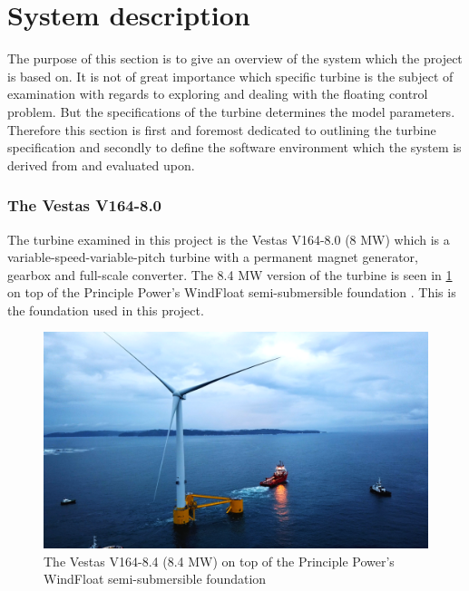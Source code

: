 \section{System description} \label{sec:sys-descr}
The purpose of this section is to give an overview of the system which the project is based on. It is not of great importance which specific turbine is the subject of examination with regards to exploring and dealing with the floating control problem. But the specifications of the turbine determines the model parameters. Therefore this section is first and foremost dedicated to outlining the turbine specification and secondly to define the software environment which the system is derived from and evaluated upon. 

\subsubsection{The Vestas V164-8.0}
The turbine examined in this project is the Vestas V164-8.0 (8 MW) which is a variable-speed-variable-pitch turbine with a permanent magnet generator, gearbox and full-scale converter. The 8.4 MW version of the turbine is seen in \cref{fig:v164_8.4mw} on top of the Principle Power’s WindFloat semi-submersible foundation \cite{WindFloatAtlantic}. This is the foundation used in this project. 


\begin{figure}[ht]
	\centering
	\includegraphics[width=0.80\linewidth]{Graphics/v164-8_4mw_floating.png}
	\caption{The Vestas V164-8.4 (8.4 MW) on top of the Principle Power’s WindFloat semi-submersible foundation}
	\label{fig:v164_8.4mw}
\end{figure}

